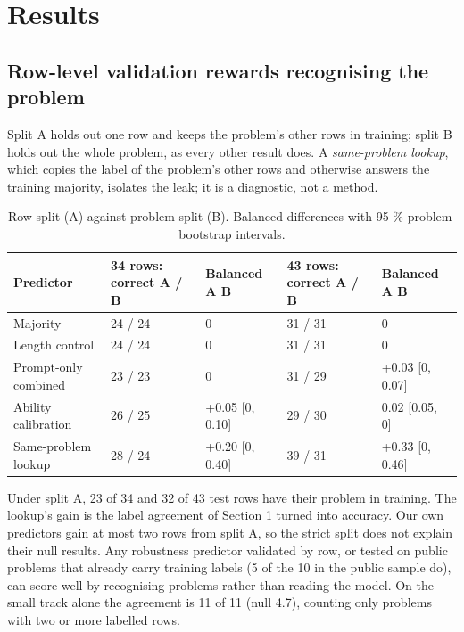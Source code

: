 \documentclass{article}
\begin{document}
\section{Results}

\subsection{Row-level validation rewards recognising the problem}

Split A holds out one row and keeps the problem's other rows in training; split B holds out the whole problem, as every other result does. A \emph{same-problem lookup}, which copies the label of the problem's other rows and otherwise answers the training majority, isolates the leak; it is a diagnostic, not a method.

\begin{table}[h]
\centering
\small
\caption{Row split (A) against problem split (B). Balanced differences with 95 \% problem-bootstrap intervals.}\label{tab:split}
\begin{tabular}{@{}p{3.4cm}p{2.0cm}p{2.1cm}p{2.0cm}p{2.3cm}@{}}
\toprule
Predictor & 34 rows: correct A / B & Balanced A \textminus{} B & 43 rows: correct A / B & Balanced A \textminus{} B \\
\midrule
Majority & 24 / 24 & 0 & 31 / 31 & 0 \\
Length control & 24 / 24 & 0 & 31 / 31 & 0 \\
Prompt-only combined & 23 / 23 & 0 & 31 / 29 & +0.03 {[}0, 0.07{]} \\
Ability calibration & 26 / 25 & +0.05 {[}0, 0.10{]} & 29 / 30 & \textminus{}0.02 {[}\textminus{}0.05, 0{]} \\
Same-problem lookup & 28 / 24 & +0.20 {[}0, 0.40{]} & 39 / 31 & +0.33 {[}0, 0.46{]} \\
\bottomrule
\end{tabular}
\end{table}

Under split A, 23 of 34 and 32 of 43 test rows have their problem in training. The lookup's gain is the label agreement of Section 1 turned into accuracy. Our own predictors gain at most two rows from split A, so the strict split does not explain their null results. Any robustness predictor validated by row, or tested on public problems that already carry training labels (5 of the 10 in the public sample do), can score well by recognising problems rather than reading the model. On the small track alone the agreement is 11 of 11 (null 4.7), counting only problems with two or more labelled rows.
\end{document}
